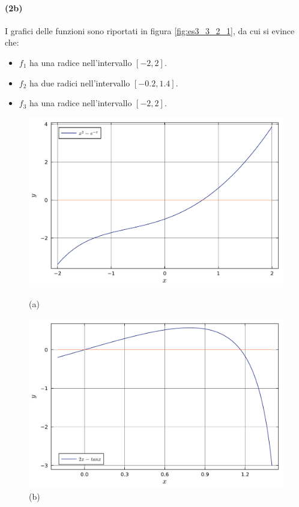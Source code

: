 \documentclass[letterpaper, 12pt]{article}
\begin{document}
\paragraph{(2b) }\label{sec:332_2b} I grafici delle funzioni sono riportati in figura \ref{fig:es3_3_2_1}, da cui si evince che:
\begin{itemize}
    \item $f_1$ ha una radice nell'intervallo $[-2,2]$.
    \item $f_2$ ha due radici nell'intervallo $[-0.2,1.4]$.
    \item $f_3$ ha una radice nell'intervallo $[-2,2]$.
\end{itemize}

\begin{figure}[!ht]
    \centering
    \begin{minipage}[b]{0.47\textwidth}
        \includegraphics[width=\textwidth]{3321.pdf}
        \caption*{(a)}
    \end{minipage}
    \hspace{0.5cm}
    \begin{minipage}[b]{0.47\textwidth}
        \includegraphics[width=\textwidth]{3322.pdf}
        \caption*{(b)}
    \end{minipage}


\end{figure}
\end{document}
